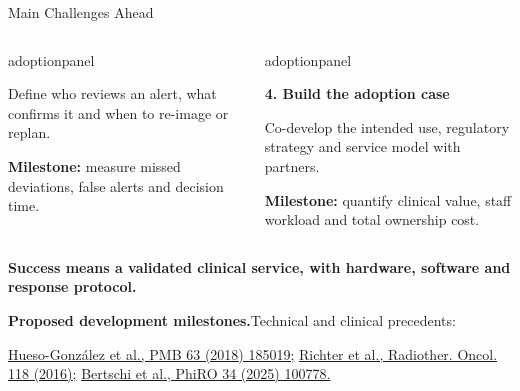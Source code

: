 \documentclass[aspectratio=169,11pt]{beamer}
\begin{document}
\begin{frame}{Main Challenges Ahead}
\begin{columns}[T,onlytextwidth]
\begin{beamercolorbox}[sep=6pt,wd=\linewidth]{adoptionpanel}
\begin{minipage}[t][1.65cm][t]{\linewidth}
\vspace{0.07cm}
{\scriptsize Define who reviews an alert, what confirms it and when to re-image or replan.\par\vspace{0.08cm}\textbf{Milestone:} measure missed deviations, false alerts and decision time.\par}
\end{minipage}
\end{beamercolorbox}
\begin{beamercolorbox}[sep=6pt,wd=\linewidth]{adoptionpanel}
\begin{minipage}[t][1.65cm][t]{\linewidth}\raggedright
{\footnotesize\bfseries\color{crBlue}4. Build the adoption case\par}
\vspace{0.07cm}
{\scriptsize Co-develop the intended use, regulatory strategy and service model with partners.\par\vspace{0.08cm}\textbf{Milestone:} quantify clinical value, staff workload and total ownership cost.\par}
\end{minipage}
\end{beamercolorbox}
\end{columns}

\vspace{0.16cm}
{\footnotesize\bfseries\color{darkred}
Success means a validated clinical service, with hardware, software and response protocol.\par}
\vfill
{\fontsize{6}{7}\selectfont\color{crGrey}\raggedright
\textbf{Proposed development milestones.}\quad Technical and clinical precedents:\par
\href{https://doi.org/10.1088/1361-6560/aad513}
{Hueso-Gonz\'alez et al., PMB 63 (2018) 185019;}\quad
\href{https://doi.org/10.1016/j.radonc.2016.01.004}
{Richter et al., Radiother. Oncol. 118 (2016);}\quad
\href{https://doi.org/10.1016/j.phro.2025.100778}
{Bertschi et al., PhiRO 34 (2025) 100778.}\par
}
\end{frame}
\end{document}
